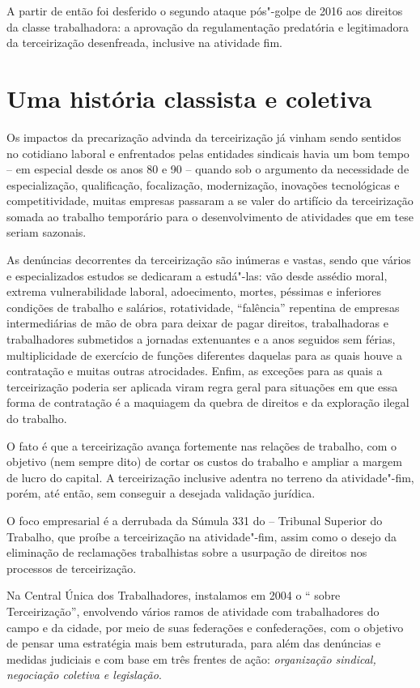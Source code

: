 A partir de então foi desferido o segundo ataque pós"-golpe de 2016 aos
direitos da classe trabalhadora: a aprovação da regulamentação
predatória e legitimadora da terceirização desenfreada, inclusive na
atividade fim.

\section{Uma história classista e coletiva}

Os impactos da precarização advinda da terceirização já vinham sendo
sentidos no cotidiano laboral e enfrentados pelas entidades sindicais
havia um bom tempo -- em especial desde os anos 80 e 90 -- quando sob o
argumento da necessidade de especialização, qualificação, focalização,
modernização, inovações tecnológicas e competitividade, muitas empresas
passaram a se valer do artifício da terceirização somada ao trabalho
temporário para o desenvolvimento de atividades que em tese seriam
sazonais.

As denúncias decorrentes da terceirização são inúmeras e vastas, sendo
que vários e especializados estudos se dedicaram a estudá"-las: vão desde
assédio moral, extrema vulnerabilidade laboral, adoecimento, mortes,
péssimas e inferiores condições de trabalho e salários, rotatividade,
``falência'' repentina de empresas intermediárias de mão de obra para
deixar de pagar direitos, trabalhadoras e trabalhadores submetidos a
jornadas extenuantes e a anos seguidos sem férias, multiplicidade de
exercício de funções diferentes daquelas para as quais houve a
contratação e muitas outras atrocidades. Enfim, as exceções para as
quais a terceirização poderia ser aplicada viram regra geral para
situações em que essa forma de contratação é a maquiagem da quebra de
direitos e da exploração ilegal do trabalho.

O fato é que a terceirização avança fortemente nas relações de trabalho,
com o objetivo (nem sempre dito) de cortar os custos do trabalho e
ampliar a margem de lucro do capital. A terceirização inclusive adentra
no terreno da atividade"-fim, porém, até então, sem conseguir a desejada
validação jurídica.

O foco empresarial é a derrubada da Súmula 331 do  -- Tribunal
Superior do Trabalho, que proíbe a terceirização na atividade"-fim, assim
como o desejo da eliminação de reclamações trabalhistas sobre a
usurpação de direitos nos processos de terceirização.

Na Central Única dos Trabalhadores, instalamos em 2004 o ``
sobre Terceirização'', envolvendo vários ramos de atividade com
trabalhadores do campo e da cidade, por meio de suas federações e
confederações, com o objetivo de pensar uma estratégia mais bem
estruturada, para além das denúncias e medidas judiciais e com base em
três frentes de ação: \emph{organização sindical, negociação coletiva e
legislação}.

